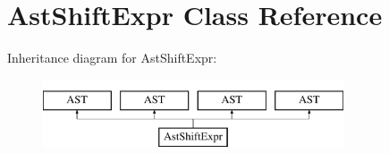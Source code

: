 \hypertarget{classAstShiftExpr}{\section{Ast\-Shift\-Expr Class Reference}
\label{classAstShiftExpr}
}
Inheritance diagram for Ast\-Shift\-Expr\-:\begin{figure}[H]
\begin{center}
\leavevmode
\includegraphics[height=2.000000cm]{classAstShiftExpr}
\end{center}
\end{figure}
